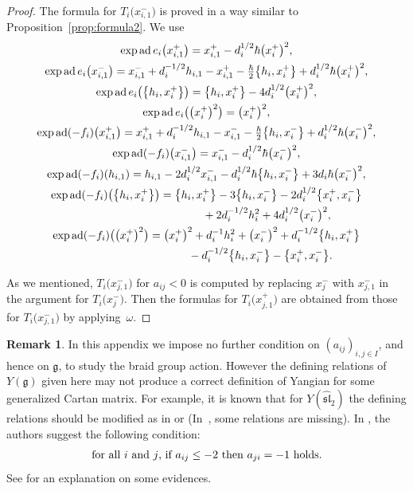 \documentclass[10pt,a4paper]{amsart}
\theoremstyle{definition}
\newtheorem{rem}[thm]{Remark}
\numberwithin{equation}{section}
\DeclareMathOperator{\ad}{ad}
\newcommand{\frakg}{\mathfrak{g}}
\begin{document}
\begin{proof}
The formula for $T_i\big(x_{i,1}^-\big)$ is proved in a way similar to Proposition~\ref{prop:formula2}. We use
\begin{gather*}
\exp\ad e_i\big(x_{i,1}^+\big) = x_{i,1}^+ - d_i^{1/2} \hbar \big(x_i^+\big)^2, \\
\exp\ad e_i \big(x_{i,1}^-\big) = x_{i,1}^- + d_i^{-1/2} h_{i,1} - x_{i,1}^+ - \tfrac{\hbar}{2}\big\{h_i,x_i^+\big\} + d_i^{1/2} \hbar \big(x_i^+\big)^2, \\
\exp\ad e_i \big(\big\{h_i,x_i^+\big\}\big) = \big\{h_i,x_i^+\big\} - 4d_i^{1/2}\big(x_i^+\big)^2, \\
\exp\ad e_i \big(\big(x_i^+\big)^2\big) = \big(x_i^+\big)^2,
\\
\exp\ad (-f_i)\big(x_{i,1}^+\big)= x_{i,1}^+ + d_i^{-1/2} h_{i,1} - x_{i,1}^- - \tfrac{\hbar}{2}\big\{h_i,x_i^-\big\} + d_i^{1/2} \hbar \big(x_i^-\big)^2, \\
\exp\ad (-f_i)\big(x_{i,1}^-\big) = x_{i,1}^- - d_i^{1/2} \hbar \big(x_i^-\big)^2, \\
\exp\ad (-f_i)(h_{i,1}) = h_{i,1} - 2 d_i^{1/2} x_{i,1}^- - d_i^{1/2} \hbar \big\{h_i,x_i^-\big\} + 3 d_i \hbar \big(x_i^-\big)^2, \\
\exp\ad (-f_i)\big(\big\{h_{i},x_i^+\big\}\big) = \big\{h_i,x_i^+\big\} - 3 \big\{h_i,x_i^-\big\} - 2d_i^{1/2}\big\{x_i^+,x_i^-\big\} \\
\hphantom{\exp\ad (-f_i)\big(\big\{h_{i},x_i^+\big\}\big) =}{} + 2d_i^{-1/2} h_i^2 + 4d_i^{1/2}\big(x_i^-\big)^2, \\
\exp\ad (-f_i)\big(\big(x_i^+\big)^2\big) = \big(x_i^+\big)^2 + d_i^{-1} h_i^2 + \big(x_i^-\big)^2 + d_i^{-1/2} \big\{h_i,x_i^+\big\} \\
\hphantom{\exp\ad (-f_i)\big(\big(x_i^+\big)^2\big) =}{} - d_i^{-1/2} \big\{h_i,x_i^-\big\} - \big\{x_i^+,x_i^-\big\}.
\end{gather*}

As we mentioned, $T_i\big(x_{j,1}^-\big)$ for $a_{ij}<0$ is computed by replacing $x_j^-$ with $x_{j,1}^-$ in the argument for $T_i\big(x_{j}^-\big)$. Then the formulas for $T_i\big(x_{j,1}^+\big)$ are obtained from those for $T_i\big(x_{j,1}^-\big)$ by applying~$\omega$.
\end{proof}

\begin{rem} In this appendix we impose no further condition on $(a_{ij})_{i,j \in I}$, and hence on $\frakg$, to study the braid group action. However the defining relations of $Y(\frakg)$ given here may not produce a correct definition of Yangian for some generalized Cartan matrix. For example, it is known that for $Y(\hat{\mathfrak{sl}}_2)$ the defining relations should be modified as in \cite[Definition~5.1]{MR3898327} or \cite[Section~1.2]{MR3850574} (In~\cite{MR3898327}, some relations are missing). In \cite[equation~(2.1)]{GRW}, the authors suggest the following condition:
\begin{gather*}
\text{for all $i$ and $ j$, if $a_{ij} \leq -2$ then $a_{ji}=-1$ holds}.
\end{gather*}
See \cite[Section~2, Lemma~4.2, Remark~5.15]{GRW} for an explanation on some evidences.
\end{rem}
\end{document}
